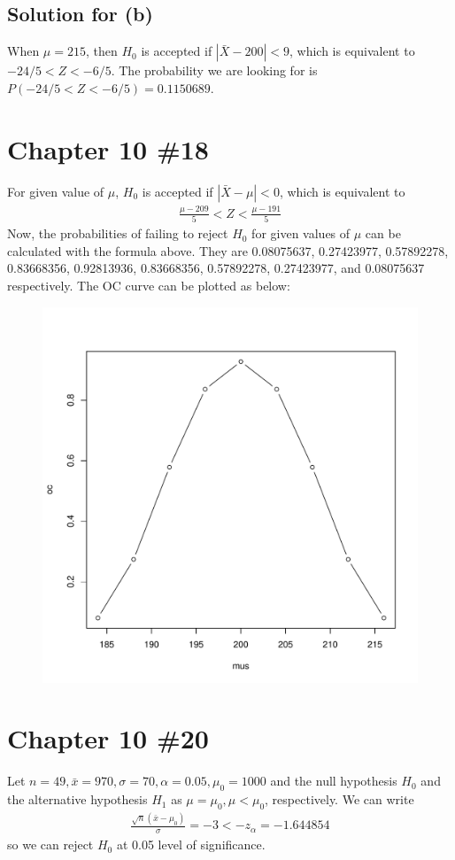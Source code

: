 \documentclass{scrartcl}
\begin{document}
\subsection{Solution for (b)}
When \(\mu = 215\), then \(H_0\) is accepted if \(|\bar{X} - 200| < 9\), which
is equivalent to \(-24/5 < Z < -6/5\). The probability we are looking for is
\(P(-24/5 < Z < -6/5) = 0.1150689\).

\section{Chapter 10 \#18}
For given value of \(\mu\), \(H_0\) is accepted if \(|\bar{X} - \mu| < 0\),
which is equivalent to
\begin{align*}
  \frac{\mu - 209}{5}
  < Z
  < \frac{\mu - 191}{5}
\end{align*}
Now, the probabilities of failing to reject \(H_0\) for given values of \(\mu\)
can be calculated with the formula above. They are 0.08075637, 0.27423977,
0.57892278, 0.83668356, 0.92813936, 0.83668356, 0.57892278, 0.27423977, and
0.08075637 respectively. The OC curve can be plotted as below:
\begin{figure}[H]
  \centering
  \includegraphics[width=0.7\linewidth]{ocplot.pdf}
\end{figure}

\section{Chapter 10 \#20}
Let \(n = 49, \bar{x} = 970, \sigma = 70, \alpha = 0.05, \mu_0 = 1000\) and the
null hypothesis \(H_0\) and the alternative hypothesis \(H_1\) as \(\mu =
\mu_0, \mu < \mu_0\), respectively. We can write
\begin{align*}
  \frac{\sqrt{n} (\bar{x} - \mu_0)}{\sigma}
  = -3
  < -z_\alpha
  = -1.644854
\end{align*}
so we can reject \(H_0\) at 0.05 level of significance.
\end{document}
